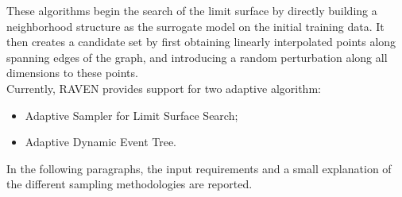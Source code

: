 These algorithms begin the search of the limit surface by directly building a neighborhood structure as the surrogate model on the initial training data. It then creates a candidate set by first obtaining linearly interpolated points along spanning edges  of the graph, and introducing a random perturbation along all dimensions to these points.
\\ Currently, RAVEN provides support for two adaptive algorithm:
\begin{itemize}
\item Adaptive Sampler for Limit Surface Search;
\item Adaptive Dynamic Event Tree.
\end{itemize}
In the following paragraphs, the input requirements and a small explanation of the different sampling methodologies are reported.
